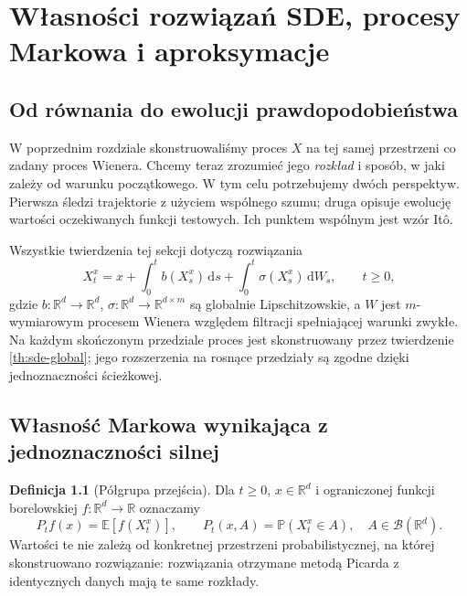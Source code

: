 \documentclass[11pt,a4paper,oneside]{report}
\numberwithin{equation}{chapter}
\theoremstyle{plain}
\theoremstyle{definition}
\newtheorem{definicja}{Definicja}[chapter]
\theoremstyle{remark}
\newcommand{\R}{\mathbb{R}}
\newcommand{\Prob}{\mathbb{P}}
\newcommand{\E}{\mathbb{E}}
\newcommand{\calB}{\mathcal{B}}
\newcommand{\dd}{\mathrm{d}}
\begin{document}
\chapter{Własności rozwiązań SDE, procesy Markowa i aproksymacje}
\label{chap:volIII:06}
\par\smallskip{}\par\smallskip

\label{ch:sde-properties}

\section{Od równania do ewolucji prawdopodobieństwa}\label{sec:volIII:06:01}
W poprzednim rozdziale skonstruowaliśmy proces $X$ na tej
samej przestrzeni co zadany proces Wienera. Chcemy teraz
zrozumieć jego \emph{rozkład} i sposób, w jaki zależy od
warunku początkowego. W tym celu potrzebujemy dwóch
perspektyw. Pierwsza śledzi trajektorie z użyciem wspólnego
szumu; druga opisuje ewolucję wartości oczekiwanych
funkcji testowych. Ich punktem wspólnym jest wzór Itô.

Wszystkie twierdzenia tej sekcji dotyczą rozwiązania
\[
X_t^x=x+\int_0^t b(X_s^x)\,\dd s
+\int_0^t\sigma(X_s^x)\,\dd W_s,\qquad t\ge0,
\tag{6.1}\label{eq:timehom-sde}
\]
gdzie $b:\R^d\to\R^d$, $\sigma:\R^d\to\R^{d\times m}$
są globalnie Lipschitzowskie, a $W$ jest $m$-wymiarowym
procesem Wienera względem filtracji spełniającej warunki
zwykłe. Na każdym skończonym przedziale proces jest
skonstruowany przez twierdzenie \ref{th:sde-global};
jego rozszerzenia na rosnące przedziały są zgodne
dzięki jednoznaczności ścieżkowej.

\section{Własność Markowa wynikająca z jednoznaczności silnej}\label{sec:volIII:06:02}
\begin{definicja}[Półgrupa przejścia]\label{def:volIII:06:01}
Dla $t\ge0$, $x\in\R^d$ i ograniczonej funkcji
borelowskiej $f:\R^d\to\R$ oznaczamy
\[
P_tf(x)=\E[f(X_t^x)],\qquad
P_t(x,A)=\Prob(X_t^x\in A),\quad A\in\calB(\R^d).
\tag{6.2}\label{eq:sde-semigroup}
\]
Wartości te nie zależą od konkretnej przestrzeni
probabilistycznej, na której skonstruowano rozwiązanie:
rozwiązania otrzymane metodą Picarda z identycznych
danych mają te same rozkłady.
\end{definicja}
\end{document}
